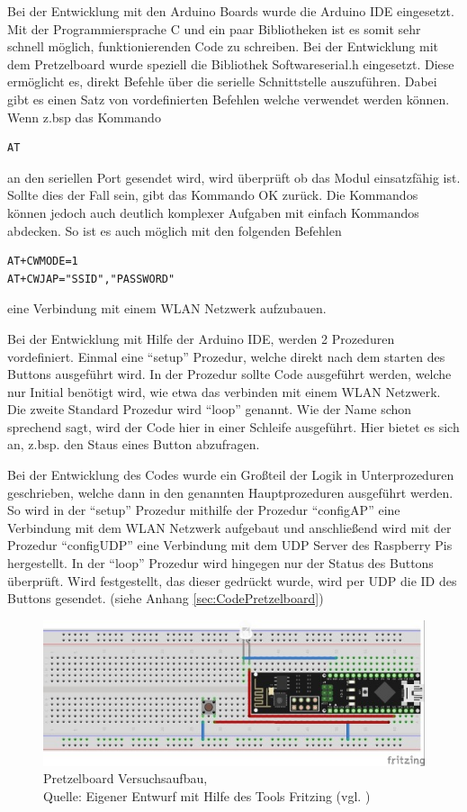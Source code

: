 Bei der Entwicklung mit den Arduino Boards wurde die Arduino IDE eingesetzt.
Mit der Programmiersprache C und ein paar Bibliotheken ist es somit sehr schnell möglich, funktionierenden Code zu schreiben.
Bei der Entwicklung mit dem Pretzelboard wurde speziell die Bibliothek Softwareserial.h eingesetzt.
Diese ermöglicht es, direkt Befehle über die serielle Schnittstelle auszuführen.
Dabei gibt es einen Satz von vordefinierten Befehlen welche verwendet werden können.
Wenn z.bsp das Kommando 
\begin{lstlisting}
AT
\end{lstlisting}
an den seriellen Port gesendet wird, wird überprüft ob das Modul einsatzfähig ist.
Sollte dies der Fall sein, gibt das Kommando OK zurück.
Die Kommandos können jedoch auch deutlich komplexer Aufgaben mit einfach Kommandos abdecken.
So ist es auch möglich mit den folgenden Befehlen
\begin{lstlisting}
AT+CWMODE=1
AT+CWJAP="SSID","PASSWORD"
\end{lstlisting}
eine Verbindung mit einem WLAN Netzwerk aufzubauen.

Bei der Entwicklung mit Hilfe der Arduino IDE, werden 2 Prozeduren vordefiniert.
Einmal eine "`setup"' Prozedur, welche direkt nach dem starten des Buttons ausgeführt wird.
In der Prozedur sollte Code ausgeführt werden, welche nur Initial benötigt wird, wie etwa das verbinden mit einem WLAN Netzwerk.
Die zweite Standard Prozedur wird "`loop"' genannt.
Wie der Name schon sprechend sagt, wird der Code hier in einer Schleife ausgeführt.
Hier bietet es sich an, z.bsp. den Staus eines Button abzufragen.

Bei der Entwicklung des Codes wurde ein Großteil der Logik in Unterprozeduren geschrieben, welche dann in den genannten Hauptprozeduren ausgeführt werden.
So wird in der "`setup"' Prozedur mithilfe der Prozedur "`configAP"' eine Verbindung mit dem WLAN Netzwerk aufgebaut und anschließend wird mit der Prozedur "`configUDP"' eine Verbindung mit dem UDP Server des Raspberry Pis hergestellt.
In der "`loop"' Prozedur wird hingegen nur der Status des Buttons überprüft.
Wird festgestellt, das dieser gedrückt wurde, wird per UDP die ID des Buttons gesendet. 
(siehe Anhang \ref{sec:CodePretzelboard})

\begin{figure}[H]
	\centering
	\includegraphics[scale=1.5]{Pretzel_Fritzing.jpg}
	\caption[Pretzelboard Versuchsaufbau]{Pretzelboard Versuchsaufbau,\\ Quelle: Eigener Entwurf mit Hilfe des Tools Fritzing (vgl. \cite{.fritz})}
\end{figure}